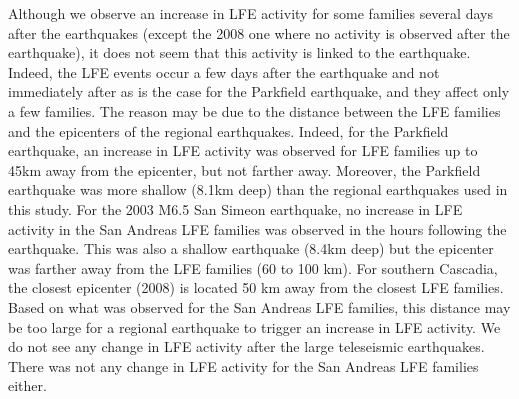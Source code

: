 \documentclass[draft]{agujournal2019}
\begin{document}
Although we observe an increase in LFE activity for some families several days after the earthquakes (except the 2008 one where no activity is observed after the earthquake), it does not seem that this activity is linked to the earthquake. Indeed, the LFE events occur a few days after the earthquake and not immediately after as is the case for the Parkfield earthquake, and they affect only a few families. The reason may be due to the distance between the LFE families and the epicenters of the regional earthquakes. Indeed, for the Parkfield earthquake, an increase in LFE activity was observed for LFE families up to 45km away from the epicenter, but not farther away. Moreover, the Parkfield earthquake was more shallow (8.1km deep) than the regional earthquakes used in this study. For the 2003 M6.5 San Simeon earthquake, no increase in LFE activity in the San Andreas LFE families was observed in the hours following the earthquake. This was also a shallow earthquake (8.4km deep) but the epicenter was farther away from the LFE families (60 to 100 km). For southern Cascadia, the closest epicenter (2008) is located 50 km away from the closest LFE families. Based on what was observed for the San Andreas LFE families, this distance may be too large for a regional earthquake to trigger an increase in LFE activity. We do not see any change in LFE activity after the large teleseismic earthquakes. There was not any change in LFE activity for the San Andreas LFE families either. \\
\end{document}
